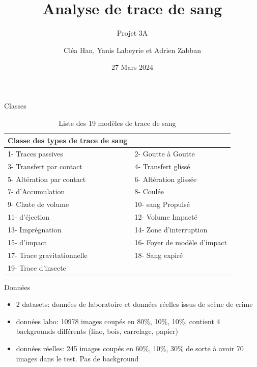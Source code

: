 \documentclass[11pt]{beamer}
\title{Analyse de trace de sang}
\subtitle{Projet 3A}
\author{Cléa Han, Yanis Labeyrie et Adrien Zabban}
\date{27 Mars 2024}
\begin{document}
\maketitle

\begin{frame}{Classes}
    \begin{table}[ht]
        \centering
        \begin{tabular}{|ll|}
            \hline
            \textbf{Classe des types de trace de sang} &  \\
            \hline
            1- Traces passives & 2- Goutte à Goutte \\
            3- Transfert par contact & 4- Transfert glissé \\
            5- Altération par contact & 6- Altération glissée \\
            7- d'Accumulation & 8- Coulée \\
            9- Chute de volume & 10- sang Propulsé \\
            11- d'éjection & 12- Volume Impacté \\
            13- Imprégnation & 14- Zone d'interruption \\
            15- d'impact & 16- Foyer de modèle d'impact \\
            17- Trace gravitationnelle & 18- Sang expiré \\
            19- Trace d'insecte & \\
            \hline
        \end{tabular}
        \caption{Liste des 19 modèles de trace de sang}
        \label{tab:classes}
    \end{table}
\end{frame}

\begin{frame}{Données}
    \begin{itemize}
        \item 2 datasets: données de laboratoire et données réelles issus de scène de crime
        \item données labo: 10978 images coupés en 80\%, 10\%, 10\%, contient 4 backgrounds différents (lino, bois, carrelage, papier)
        \item données réelles: 245 images coupés en 60\%, 10\%, 30\% de sorte à avoir 70 images dans le test. Pas de background
    \end{itemize}
\end{frame}
\end{document}
